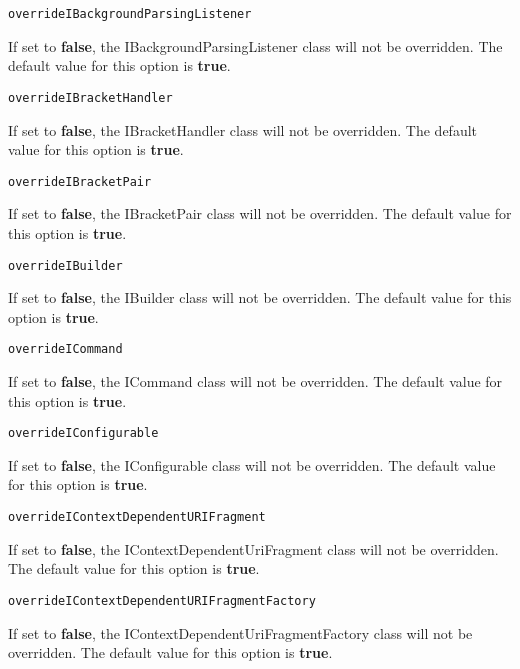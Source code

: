 \noindent\texttt{overrideIBackgroundParsingListener}
\begin{myindentpar}{1cm}
If set to \textbf{false}, the IBackgroundParsingListener class will not be overridden. The default value for this option is \textbf{true}.
\end{myindentpar}

\noindent\texttt{overrideIBracketHandler}
\begin{myindentpar}{1cm}
If set to \textbf{false}, the IBracketHandler class will not be overridden. The default value for this option is \textbf{true}.
\end{myindentpar}

\noindent\texttt{overrideIBracketPair}
\begin{myindentpar}{1cm}
If set to \textbf{false}, the IBracketPair class will not be overridden. The default value for this option is \textbf{true}.
\end{myindentpar}

\noindent\texttt{overrideIBuilder}
\begin{myindentpar}{1cm}
If set to \textbf{false}, the IBuilder class will not be overridden. The default value for this option is \textbf{true}.
\end{myindentpar}

\noindent\texttt{overrideICommand}
\begin{myindentpar}{1cm}
If set to \textbf{false}, the ICommand class will not be overridden. The default value for this option is \textbf{true}.
\end{myindentpar}

\noindent\texttt{overrideIConfigurable}
\begin{myindentpar}{1cm}
If set to \textbf{false}, the IConfigurable class will not be overridden. The default value for this option is \textbf{true}.
\end{myindentpar}

\noindent\texttt{overrideIContextDependentURIFragment}
\begin{myindentpar}{1cm}
If set to \textbf{false}, the IContextDependentUriFragment class will not be overridden. The default value for this option is \textbf{true}.
\end{myindentpar}

\noindent\texttt{overrideIContextDependentURIFragmentFactory}
\begin{myindentpar}{1cm}
If set to \textbf{false}, the IContextDependentUriFragmentFactory class will not be overridden. The default value for this option is \textbf{true}.
\end{myindentpar}

